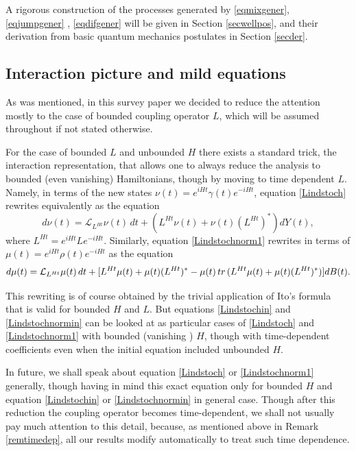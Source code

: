 \documentclass[10pt,a4paper]{amsart}
\def\LC{\mathcal{L}}
\def\tr{\rm{tr}}
\def\ga{\gamma}
\begin{document}
A rigorous construction of the processes generated by
\eqref{eqmixgener}, \eqref{eqjumpgener} , \eqref{eqdifgener}
will be given in Section \ref{secwellpos},
 and their derivation from basic quantum mechanics postulates in Section \ref{secder}.

\subsection{Interaction picture and mild equations}
\label{secinter}

As was mentioned, in this survey paper we decided to reduce the attention mostly
 to the case of bounded coupling operator $L$,
which will be assumed throughout if not stated otherwise.

For the case of bounded $L$ and unbounded $H$ there exists a standard trick,
the interaction representation,
that allows one to always reduce the analysis to bounded (even vanishing) Hamiltonians, though by moving
to time dependent $L$.  Namely, in terms of the new states $\nu(t)=e^{iHt}\ga(t) e^{-iHt}$,
equation \eqref{Lindstoch} rewrites equivalently as the equation
\begin{equation}
\label{Lindstochin}
d\nu(t)=\LC_{L^{Ht}} \nu(t) \, dt +(L^{Ht}\nu(t)+\nu(t) (L^{Ht})^*) dY(t),
\end{equation}
where $L^{Ht}=e^{iHt} L e^{-iHt}$. Similarly, equation \eqref{Lindstochnorm1} rewrites in terms of
$\mu(t)=e^{iHt}\rho(t) e^{-iHt}$ as the equation
\begin{equation}
\label{Lindstochnormin}
d\mu(t)=\LC_{L^{Ht}} \mu (t)\, dt
+[L^{Ht}\mu(t)+\mu(t) (L^{Ht})^*-\mu(t)\, {\tr} \, (L^{Ht}\mu(t)+\mu(t) (L^{Ht})^*) ] dB(t).
\end{equation}

 This rewriting is of course obtained by the trivial application
of Ito's formula that is valid for bounded $H$ and $L$. But
equations  \eqref{Lindstochin} and \eqref{Lindstochnormin} can be looked at as particular cases
of  \eqref{Lindstoch} and \eqref{Lindstochnorm1} with bounded (vanishing ) $H$,
though with time-dependent coefficients even when the initial equation included unbounded $H$.

In future, we shall speak about equation \eqref{Lindstoch} or \eqref{Lindstochnorm1} generally,
though having in mind this exact equation only for bounded $H$ and equation \eqref{Lindstochin}
or \eqref{Lindstochnormin} in general case. Though after this reduction the coupling operator becomes
time-dependent, we shall not usually pay much attention to this detail, because, as mentioned
above in Remark \ref{remtimedep}, all our results modify automatically to treat such time dependence.
\end{document}
